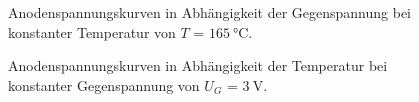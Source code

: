 \begin{figure}[!ht]
    \medskip

  \caption{Anodenspannungskurven in Abhängigkeit der Gegenspannung bei konstanter Temperatur von $T$ = $\SI{165}{\celsius}$.}
\label{fig:UGall}
\end{figure}

\begin{figure}[!ht]
    \centering
  
    \medskip

  \caption{Anodenspannungskurven in Abhängigkeit der Temperatur bei konstanter Gegenspannung von $U_G$ = $\SI{3}{\volt}$.}
\label{fig:Tall}
\end{figure}


